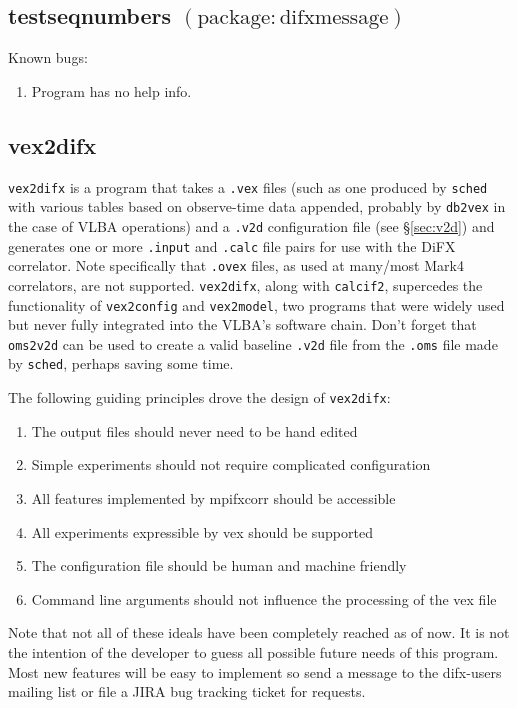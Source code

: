 \subsection{testseqnumbers {\small $\mathrm{(package: difxmessage)}$}} \label{sec:testsequnumbers} 

\noindent
Known bugs:
\begin{enumerate}
\item Program has no help info.
\end{enumerate}


\subsection{vex2difx} \label{sec:vex2difx}

{\tt vex2difx} is a program that takes a {\tt .vex} files (such as one produced by {\tt sched} with various tables based on observe-time data appended, probably by {\tt db2vex} in the case of VLBA operations) and a {\tt .v2d} configuration file (see \S\ref{sec:v2d}) and generates one or more {\tt .input} and {\tt .calc} file pairs for use with the DiFX correlator. 
Note specifically that {\tt .ovex} files, as used at many/most Mark4 correlators, are not supported.
{\tt vex2difx}, along with {\tt calcif2}, supercedes the functionality of {\tt vex2config} and {\tt vex2model}, two programs that were widely used but never fully integrated into the VLBA's software chain. 
Don't forget that {\tt oms2v2d} can be used to create a valid baseline {\tt .v2d} file from the {\tt .oms} file made by {\tt sched}, perhaps saving some time.

The following guiding principles drove the design of {\tt vex2difx}:
\begin{enumerate}
  \item The output files should never need to be hand edited
  \item Simple experiments should not require complicated configuration
  \item All features implemented by mpifxcorr should be accessible
  \item All experiments expressible by vex should be supported
  \item The configuration file should be human and machine friendly
  \item Command line arguments should not influence the processing of the vex file
\end{enumerate}
Note that not all of these ideals have been completely reached as of now. It is not the intention of the developer to guess all possible future needs of this program. 
Most new features will be easy to implement so send a message to the difx-users mailing list or file a JIRA \cite{jira} bug tracking ticket for requests.

